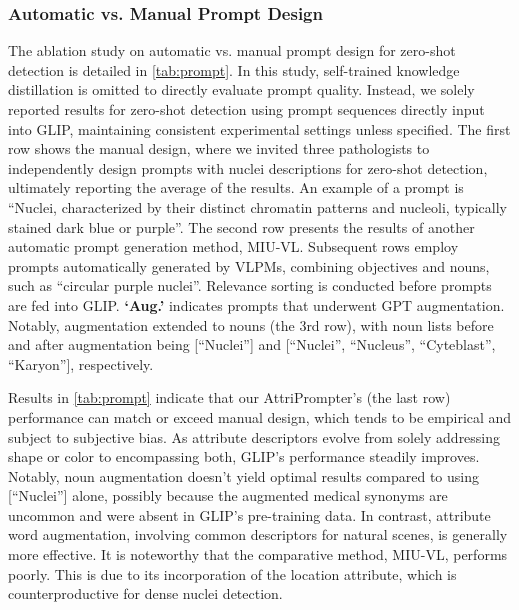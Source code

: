 \documentclass[journal,twoside,web]{ieeecolor}
\begin{document}
\subsubsection{Automatic vs. Manual Prompt Design} The ablation study on automatic vs. manual prompt design for zero-shot detection is detailed in \autoref{tab:prompt}. In this study, self-trained knowledge distillation is omitted to directly evaluate prompt quality. Instead, we solely reported results for zero-shot detection using prompt sequences directly input into GLIP, maintaining consistent experimental settings unless specified. The first row shows the manual design, where we invited three pathologists to independently design prompts with nuclei descriptions for zero-shot detection, ultimately reporting the average of the results. An example of a prompt is ``Nuclei, characterized by their distinct chromatin patterns and nucleoli, typically stained dark blue or purple''. The second row presents the results of another automatic prompt generation method, MIU-VL.  Subsequent rows employ prompts automatically generated by VLPMs, combining objectives and nouns, such as ``circular purple nuclei''. Relevance sorting is conducted before prompts are fed into GLIP. \textbf{`Aug.'} indicates prompts that underwent GPT augmentation. Notably, augmentation extended to nouns (the 3rd row), with noun lists before and after augmentation being [``Nuclei''] and [``Nuclei'', ``Nucleus'', ``Cyteblast'', ``Karyon''], respectively. 

Results in \autoref{tab:prompt} indicate that our AttriPrompter's (the last row) performance can match or exceed manual design, which tends to be empirical and subject to subjective bias. As attribute descriptors evolve from solely addressing shape or color to encompassing both, GLIP's performance steadily improves. Notably, noun augmentation doesn't yield optimal results compared to using [``Nuclei''] alone, possibly because the augmented medical synonyms are uncommon and were absent in GLIP's pre-training data. In contrast, attribute word augmentation, involving common descriptors for natural scenes, is generally more effective. It is noteworthy that the comparative method, MIU-VL, performs poorly. This is due to its incorporation of the location attribute, which is counterproductive for dense nuclei detection.
\end{document}
